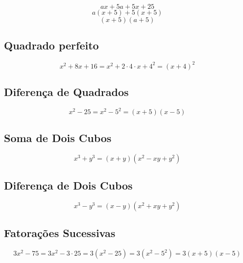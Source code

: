 	$$ax+ 5a + 5x + 25$$
	$$a(x+5)+5(x+5)$$
	$$(x+5)(a+5)$$
	
\subsection{Quadrado perfeito}

	$$x^{2} + 8x +16 = x^{2}+2\cdot 4\cdot x + 4^{2} = (x+4)^{2}$$
	
	
\subsection{Diferença de Quadrados}

	$$x^{2} - 25 = x^{2} - 5^{2} = (x+5)(x-5)$$
	
\subsection{Soma de Dois Cubos}

	$$x^{3}+y^{3} = (x+y)(x^{2} - xy + y^{2})$$
	
\subsection{Diferença de Dois Cubos}

	$$x^{3} - y^{3} = (x-y)(x^{2} + xy + y^{2})$$
	
\subsection{Fatorações Sucessivas}

	$$3x^{2} - 75 = 3x^{2} - 3\cdot 25 = 3(x^{2} - 25) = 3(x^{2} - 5^{2}) = 3(x+5)(x-5)$$
	